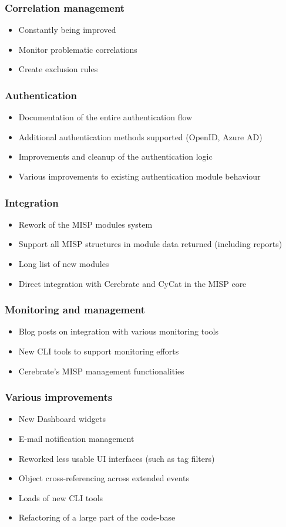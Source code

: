 \begin{frame}
\frametitle{Correlation management}
\begin{itemize}
	\item Constantly being improved
        \item Monitor problematic correlations
        \item Create exclusion rules
\end{itemize}
\end{frame}

\begin{frame}
\frametitle{Authentication}
\begin{itemize}
	\item Documentation of the entire authentication flow
        \item Additional authentication methods supported (OpenID, Azure AD)
        \item Improvements and cleanup of the authentication logic
        \item Various improvements to existing authentication module behaviour
\end{itemize}
\end{frame}

\begin{frame}
\frametitle{Integration}
\begin{itemize}
	\item Rework of the MISP modules system
        \item Support all MISP structures in module data returned (including reports)
        \item Long list of new modules
        \item Direct integration with Cerebrate and CyCat in the MISP core
\end{itemize}
\end{frame}

\begin{frame}
\frametitle{Monitoring and management}
\begin{itemize}
	\item Blog posts on integration with various monitoring tools
        \item New CLI tools to support monitoring efforts
        \item Cerebrate's MISP management functionalities
\end{itemize}
\end{frame}

\begin{frame}
\frametitle{Various improvements}
\begin{itemize}
	\item New Dashboard widgets
        \item E-mail notification management
        \item Reworked less usable UI interfaces (such as tag filters)
        \item Object cross-referencing across extended events
        \item Loads of new CLI tools
        \item Refactoring of a large part of the code-base
\end{itemize}
\end{frame}


